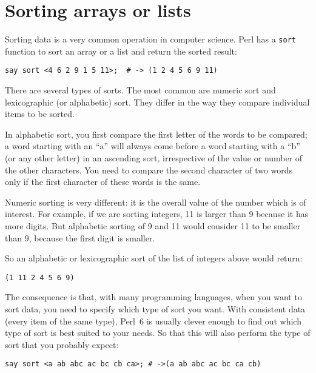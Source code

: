 \section{Sorting arrays or lists}
\label{sorting}

Sorting data is a very common operation in computer 
science. Perl has a {\tt sort} function to sort an array 
or a list and return the sorted result:

\begin{verbatim}
say sort <4 6 2 9 1 5 11>;  # -> (1 2 4 5 6 9 11)
\end{verbatim}

There are several types of sorts. The most common are numeric 
sort and lexicographic (or alphabetic) sort. They differ 
in the way they compare individual items to be sorted. 

In alphabetic sort, you first compare the first letter of 
the words to be compared; a word starting with an ``a'' 
will always come before a word starting with a ``b'' 
(or any other letter) in an ascending sort, irrespective 
of the value or number of the other characters. You need to 
compare the second character of two words only if 
the first character of these words is the same. 

Numeric sorting is very different: it is the overall 
value of the number which is of interest. For example, 
if we are sorting integers, 11 is larger than 9 because 
it has more digits. But alphabetic sorting of 9 and 11 
would consider 11 to be smaller than 9, because the 
first digit is smaller.

So an alphabetic or lexicographic sort of the list of 
integers above would return:

\begin{verbatim}
(1 11 2 4 5 6 9)
\end{verbatim}

The consequence is that, with many programming languages, 
when you want to sort data, you need to specify which 
type of sort you want. With consistent data (every item 
of the same type), Perl~6 is usually clever enough to 
find out which type of sort is best suited to your 
needs. So that this will also perform the type of 
sort that you probably expect:

\begin{verbatim}
say sort <a ab abc ac bc cb ca>; # ->(a ab abc ac bc ca cb)
\end{verbatim}

